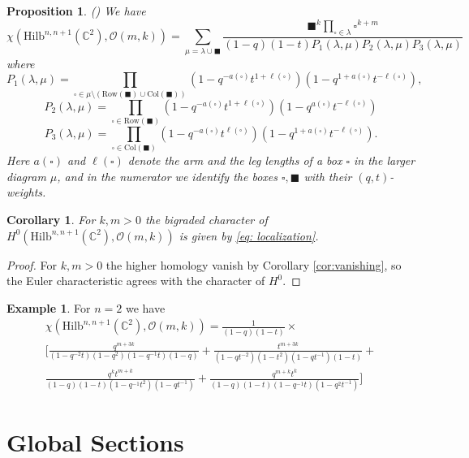 \documentclass[12pt]{amsart}
\newcommand{\Hilb}{\mathrm{Hilb}}
\newcommand{\C}{\mathbb{C}}
\newcommand{\CO}{\mathcal{O}}
\newcommand{\Row}{\mathrm{Row}}
\newcommand{\Col}{\mathrm{Col}}
\numberwithin{equation}{section}
\newtheorem{proposition}[theorem]{Proposition}
\newtheorem{corollary}[theorem]{Corollary}
\theoremstyle{definition}
\newtheorem{example}[theorem]{Example}
\newcommand{\sq}{\square}
\newcommand{\bsq}{\blacksquare}
\begin{document}
\begin{proposition}(\cite[Theorem 2.7]{Can})
We have
\begin{equation}
\label{eq: localization}
\chi(\Hilb^{n,n+1}(\C^2),\CO(m,k))=\sum_{\mu=\lambda\cup \bsq} \frac{\bsq^{k}\prod_{\sq\in \lambda}\sq^{k+m}}{(1-q)(1-t)P_1(\lambda,\mu)P_2(\lambda,\mu)P_3(\lambda,\mu)}
\end{equation}
where 
$$
P_1(\lambda,\mu)=\prod_{\sq\in \mu\setminus\left(\Row(\bsq)\cup\Col(\bsq)\right)}\left(1-q^{-a(\sq)}t^{1+\ell(\sq)}\right)\left(1-q^{1+a(\sq)}t^{-\ell(\sq)}\right),
$$
$$
P_2(\lambda,\mu)=\prod_{\sq\in  \Row(\bsq)}\left(1-q^{-a(\sq)}t^{1+\ell(\sq)}\right)\left(1-q^{a(\sq)}t^{-\ell(\sq)}\right)
$$
$$
P_3(\lambda,\mu)=\prod_{\sq\in  \Col(\bsq)}\left(1-q^{-a(\sq)}t^{\ell(\sq)}\right)\left(1-q^{1+a(\sq)}t^{-\ell(\sq)}\right).
$$
Here $a(\sq)$ and $\ell(\sq)$ denote the arm and the leg lengths of a box $\sq$ in the larger diagram $\mu$, and  in the numerator we identify the boxes $\sq,\bsq$ with their $(q,t)$-weights.
\end{proposition}

\begin{corollary}
\label{cor: localization}
For $k,m>0$ the bigraded character of $H^0(\Hilb^{n,n+1}(\C^2),\CO(m,k))$  is given by \eqref{eq: localization}.
\end{corollary}

\begin{proof}
For $k,m>0$   the higher homology vanish by Corollary \ref{cor:vanishing}, so the Euler characteristic agrees with the character of $H^0$.
\end{proof}

\begin{example}
\label{ex: n=2 localization}
For $n=2$ we have
\begin{multline*}
\chi(\Hilb^{n,n+1}(\C^2),\CO(m,k))=\frac{1}{(1-q)(1-t)}\times\\
\Biggl[\frac{q^{m+3k}}{(1-q^{-2}t)(1-q^2)(1-q^{-1}t)(1-q)}+\frac{t^{m+3k}}{(1-qt^{-2})(1-t^2)(1-qt^{-1})(1-t)}+\\
\frac{q^{k}t^{m+k}}{(1-q)(1-t)(1-q^{-1}t^2)(1-qt^{-1})}+\frac{q^{m+k}t^k}{(1-q)(1-t)(1-q^{-1}t)(1-q^2t^{-1})}\Biggr]
\end{multline*}
\end{example}






\section{Global Sections}
\label{sec: global sections}
\end{document}
